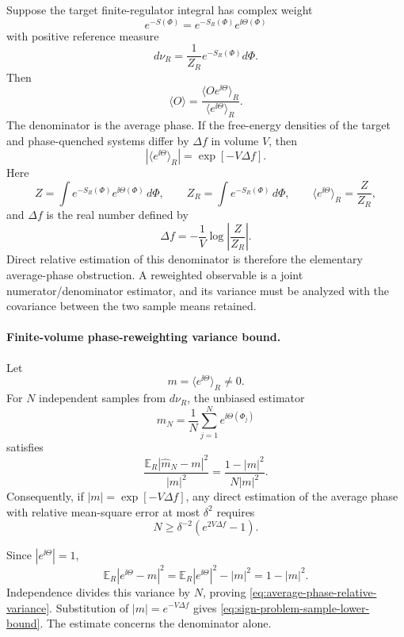 Suppose the target finite-regulator integral has complex weight
\[
  e^{-S(\Phi)}=e^{-S_R(\Phi)}e^{\ii\Theta(\Phi)}
\]
with positive reference measure
\[
  d\nu_R=\frac{1}{Z_R}e^{-S_R(\Phi)}d\Phi .
\]
Then
\[
  \langle O\rangle
  =
  \frac{\langle Oe^{\ii\Theta}\rangle_R}
  {\langle e^{\ii\Theta}\rangle_R}.
\]
The denominator is the average phase.  If the free-energy densities of the
target and phase-quenched systems differ by \(\Delta f\) in volume \(V\), then
\[
  \left|\langle e^{\ii\Theta}\rangle_R\right|
  =
  \exp[-V\Delta f].
\]
Here
\[
  Z=\int e^{-S_R(\Phi)}e^{\ii\Theta(\Phi)}\,d\Phi,\qquad
  Z_R=\int e^{-S_R(\Phi)}\,d\Phi,
  \qquad
  \langle e^{\ii\Theta}\rangle_R=\frac{Z}{Z_R},
\]
and \(\Delta f\) is the real number defined by
\begin{equation}
  \Delta f=-\frac1V\log\left|\frac{Z}{Z_R}\right|.
  \label{eq:phase-quenched-free-energy-difference}
\end{equation}
Direct relative estimation of this denominator is therefore the elementary
average-phase obstruction.  A reweighted observable is a joint
numerator/denominator estimator, and its variance must be analyzed with the
covariance between the two sample means retained.

\paragraph{Finite-volume phase-reweighting variance bound.}
Let
\[
  m=\langle e^{\ii\Theta}\rangle_R\neq0 .
\]
For \(N\) independent samples from \(d\nu_R\), the unbiased estimator
\[
  \widehat m_N=\frac1N\sum_{j=1}^{N}e^{\ii\Theta(\Phi_j)}
\]
satisfies
\begin{equation}
  \frac{\mathbb E_R|\widehat m_N-m|^2}{|m|^2}
  =
  \frac{1-|m|^2}{N|m|^2}.
  \label{eq:average-phase-relative-variance}
\end{equation}
Consequently, if \(|m|=\exp[-V\Delta f]\), any direct estimation of the
average phase with relative mean-square error at most
\(\delta^2\) requires
\begin{equation}
  N\geq
  \delta^{-2}\left(e^{2V\Delta f}-1\right).
  \label{eq:sign-problem-sample-lower-bound}
\end{equation}

Since \(|e^{\ii\Theta}|=1\),
\[
  \mathbb E_R|e^{\ii\Theta}-m|^2
  =
  \mathbb E_R|e^{\ii\Theta}|^2-|m|^2
  =
  1-|m|^2 .
  \]
Independence divides this variance by \(N\), proving
\eqref{eq:average-phase-relative-variance}.  Substitution of
\(|m|=e^{-V\Delta f}\) gives
\eqref{eq:sign-problem-sample-lower-bound}.  The estimate concerns the
denominator alone.

